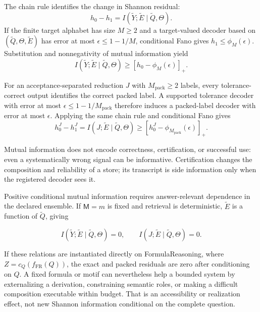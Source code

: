 \documentclass[10pt]{article} %
\providecommand{\1}{\mathbf{1}}  %
\theoremstyle{remark}
\theoremstyle{definition}
\begin{document}
The chain rule \citep[Section~2.5]{cover2006elements} identifies the
change in Shannon residual:
\begin{equation}
h_0-h_1
=I(\widetilde Y;\widetilde E\mid\widetilde Q,\Theta).
\label{eq:external-support-identity}
\end{equation}
If the finite target alphabet has size $M\geq2$ and a target-valued
decoder based on $(\widetilde Q,\Theta,\widetilde E)$ has error at most
$\epsilon\leq1-1/M$, conditional Fano gives
$h_1\leq\phi_M(\epsilon)$. Substitution and nonnegativity of mutual
information yield
\begin{equation}
I(\widetilde Y;\widetilde E\mid\widetilde Q,\Theta)
\geq\left[h_0-\phi_M(\epsilon)\right]_+.
\label{eq:external-support-fano-necessity}
\end{equation}

For an acceptance-separated reduction $J$ with $M_{\mathrm{pack}}\geq2$
labels, every tolerance-correct output identifies the correct packed
label. A supported tolerance decoder with error at most
$\epsilon\leq1-1/M_{\mathrm{pack}}$ therefore induces a packed-label
decoder with error at most $\epsilon$. Applying the same chain rule and
conditional Fano gives
\begin{equation}
h_0^J-h_1^J
=I(J;\widetilde E\mid\widetilde Q,\Theta)
\geq\left[h_0^J-\phi_{M_{\mathrm{pack}}}(\epsilon)\right]_+.
\label{eq:external-support-packing-necessity}
\end{equation}

Mutual information does not encode correctness, certification, or
successful use: even a systematically wrong signal can be informative.
Certification changes the composition and reliability of a store; its
transcript is side information only when the registered decoder sees it.

Positive conditional mutual information requires answer-relevant
dependence in the declared ensemble. If $\mathsf M=m$ is fixed and
retrieval is deterministic, $\widetilde E$ is a function of
$\widetilde Q$, giving

\begin{equation}
I(\widetilde Y;\widetilde E\mid\widetilde Q,\Theta)=0,
\qquad
I(J;\widetilde E\mid\widetilde Q,\Theta)=0.
\label{eq:fixed-store-zero-information}
\end{equation}

If these relations are instantiated directly on FormulaReasoning, where $Z=c_Q(f_{\mathrm{FR}}(Q))$, the exact and packed residuals are zero after conditioning on $Q$. A fixed formula or motif can nevertheless help a bounded system by externalizing a derivation, constraining semantic roles, or making a difficult composition executable within budget. That is an accessibility or realization effect, not new Shannon information conditional on the complete question.
\end{document}
